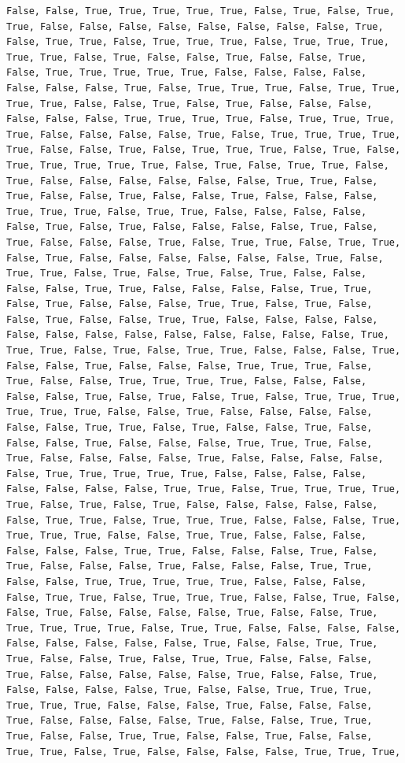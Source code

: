 \documentclass[
  letterpaper,
  DIV=11,
  numbers=noendperiod]{scrartcl}
\begin{document}
\begin{verbatim}
False, False, True, True, True, True, True, False, True, False, True, True, False, False, False, False, False, False, False, False, True, False, True, True, False, True, True, True, False, True, True, True, True, True, False, True, False, False, True, False, False, True, False, True, True, True, True, True, False, False, False, False, False, False, False, True, False, True, True, True, False, True, True, True, True, False, False, True, False, True, False, False, False, False, False, False, True, True, True, True, False, True, True, True, True, False, False, False, False, True, False, True, True, True, True, True, False, False, True, False, True, True, True, False, True, False, True, True, True, True, True, False, True, False, True, True, False, True, False, False, False, False, False, False, True, True, False, True, False, False, True, False, False, True, False, False, False, True, True, True, False, True, True, False, False, False, False, False, True, False, True, False, False, False, False, True, False, True, False, False, False, True, False, True, True, False, True, True, False, True, False, False, False, False, False, False, True, False, True, True, False, True, False, True, False, True, False, False, False, False, True, True, False, False, False, False, True, True, False, True, False, False, False, True, True, False, True, False, False, True, False, False, True, True, False, False, False, False, False, False, False, False, False, False, False, False, False, True, True, True, False, True, False, True, True, False, False, False, True, False, False, True, False, False, False, True, True, True, False, True, False, False, True, True, True, True, False, False, False, False, False, True, False, True, False, True, False, True, True, True, True, True, True, False, False, True, False, False, False, False, False, False, True, True, False, True, False, False, True, False, False, False, True, False, False, False, True, True, True, False, True, False, False, False, False, True, False, False, False, False, False, True, True, True, True, True, False, False, False, False, False, False, False, False, True, True, False, True, True, True, True, True, False, True, False, True, False, False, False, False, False, False, True, True, False, True, True, True, False, False, False, True, True, True, True, False, False, True, True, False, False, False, False, False, False, True, True, False, False, False, True, False, True, False, False, False, True, False, False, False, True, True, False, False, True, True, True, True, True, False, False, False, False, True, True, False, True, True, True, False, False, True, False, False, True, False, False, False, False, True, False, False, True, True, True, True, True, False, True, True, False, False, False, False, False, False, False, False, False, True, False, False, True, True, True, False, False, True, False, True, True, False, False, False, True, False, False, False, False, False, True, False, False, True, False, False, False, False, True, False, False, True, True, True, True, True, True, False, False, False, True, False, False, False, True, False, False, False, False, True, False, False, True, True, True, False, False, True, True, False, False, True, False, False, True, True, False, True, False, False, False, False, True, True, True, 
\end{verbatim}
\end{document}
